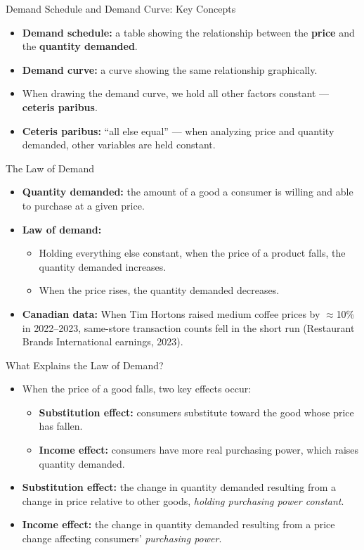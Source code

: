 \documentclass[aspectratio=169]{beamer}
\begin{document}
\begin{frame}{Demand Schedule and Demand Curve: Key Concepts}
\transfade
\begin{itemize}
  \item \textbf{Demand schedule:} a table showing the relationship between the \textbf{price} and the \textbf{quantity demanded}.
  \item \textbf{Demand curve:} a curve showing the same relationship graphically.
  \item When drawing the demand curve, we hold all other factors constant --- \textbf{ceteris paribus}.
  \item \textbf{Ceteris paribus:} ``all else equal'' --- when analyzing price and quantity demanded, other variables are held constant.
\end{itemize}
\end{frame}

\begin{frame}{The Law of Demand}
\transfade
\begin{itemize}
  \item \textbf{Quantity demanded:} the amount of a good a consumer is willing and able to purchase at a given price.
  \item \textbf{Law of demand:}
  \begin{itemize}
    \item Holding everything else constant, when the price of a product \alert{falls}, the quantity demanded \alert{increases}.
    \item When the price \alert{rises}, the quantity demanded \alert{decreases}.
  \end{itemize}
  \item \textbf{Canadian data:} When Tim Hortons raised medium coffee prices by $\approx$10\% in 2022--2023, same-store transaction counts fell in the short run (Restaurant Brands International earnings, 2023).
\end{itemize}
\end{frame}

\begin{frame}{What Explains the Law of Demand?}
\transfade
\begin{itemize}
  \item When the price of a good falls, two key effects occur:
  \begin{itemize}
    \item \textbf{Substitution effect:} consumers substitute toward the good whose price has fallen.
    \item \textbf{Income effect:} consumers have more real purchasing power, which raises quantity demanded.
  \end{itemize}
  \item \textbf{Substitution effect:} the change in quantity demanded resulting from a change in price relative to other goods, \emph{holding purchasing power constant}.
  \item \textbf{Income effect:} the change in quantity demanded resulting from a price change affecting consumers' \emph{purchasing power}.
\end{itemize}
\end{frame}
\end{document}
